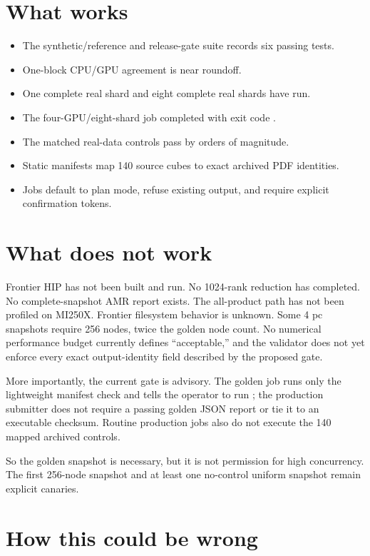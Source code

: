\documentclass[11pt]{article}
\begin{document}
\section{What works}

\begin{itemize}
  \item The synthetic/reference and release-gate suite records six passing tests.
  \item One-block CPU/GPU agreement is near roundoff.
  \item One complete real shard and eight complete real shards have run.
  \item The four-GPU/eight-shard job completed with exit code .
  \item The matched real-data controls pass by orders of magnitude.
  \item Static manifests map 140 source cubes to exact archived PDF identities.
  \item Jobs default to plan mode, refuse existing output, and require explicit
        confirmation tokens.
\end{itemize}

\section{What does not work}

Frontier HIP has not been built and run. No 1024-rank reduction has completed.
No complete-snapshot AMR report exists. The all-product path has not
been profiled on MI250X. Frontier filesystem behavior is unknown. Some 4 pc
snapshots require 256 nodes, twice the golden node count.
No numerical performance budget currently defines ``acceptable,'' and the
validator does not yet enforce every exact output-identity field described by
the proposed gate.

More importantly, the current gate is advisory. The golden job runs only the
lightweight manifest check and tells the operator to run
; the production submitter does not require a
passing golden JSON report or tie it to an executable checksum. Routine
production jobs also do not execute the 140 mapped archived controls.

So the golden snapshot is necessary, but it is not permission for high
concurrency. The first 256-node snapshot and at least one no-control uniform
snapshot remain explicit canaries.

\section{How this could be wrong}
\end{document}
